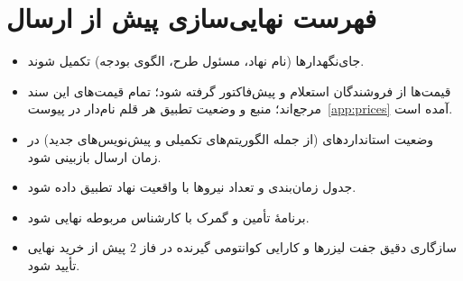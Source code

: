 \appendix
\section{فهرست نهایی‌سازی پیش از ارسال}
\begin{itemize}[leftmargin=*,itemsep=2pt]
\item جای‌نگهدار‌ها (نام نهاد، مسئول طرح، الگوی بودجه) تکمیل شوند.
\item قیمت‌ها از فروشندگان استعلام و پیش‌فاکتور گرفته شود؛ تمام قیمت‌های این سند مرجع‌اند؛ منبع و وضعیت تطبیق هر قلم نام‌دار در پیوست~\ref{app:prices} آمده است.
\item وضعیت استانداردهای  (از جمله الگوریتم‌های تکمیلی و پیش‌نویس‌های جدید) در زمان ارسال بازبینی شود.
\item جدول زمان‌بندی و تعداد نیروها با واقعیت نهاد تطبیق داده شود.
\item برنامهٔ تأمین و گمرک با کارشناس مربوطه نهایی شود.
\item سازگاری دقیق جفت لیزرها و کارایی کوانتومی گیرنده در فاز $2$ پیش از خرید نهایی تأیید شود\cite{cvreport}.
\end{itemize}

